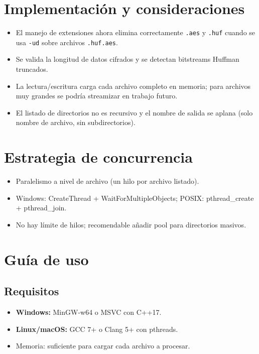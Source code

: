 \documentclass[12pt,a4paper]{article}
\begin{document}
\section{Implementación y consideraciones}
\begin{itemize}
    \item El manejo de extensiones ahora elimina correctamente \texttt{.aes} y \texttt{.huf} cuando se usa \texttt{-ud} sobre archivos \texttt{.huf.aes}.
    \item Se valida la longitud de datos cifrados y se detectan bitstreams Huffman truncados.
    \item La lectura/escritura carga cada archivo completo en memoria; para archivos muy grandes se podría streamizar en trabajo futuro.
    \item El listado de directorios no es recursivo y el nombre de salida se aplana (solo nombre de archivo, sin subdirectorios).
\end{itemize}

\section{Estrategia de concurrencia}
\begin{itemize}
    \item Paralelismo a nivel de archivo (un hilo por archivo listado).
    \item Windows: CreateThread + WaitForMultipleObjects; POSIX: pthread\_create + pthread\_join.
    \item No hay límite de hilos; recomendable añadir pool para directorios masivos.
\end{itemize}

\section{Guía de uso}

\subsection{Requisitos}
\begin{itemize}
    \item \textbf{Windows:} MinGW-w64 o MSVC con C++17.
    \item \textbf{Linux/macOS:} GCC 7+ o Clang 5+ con pthreads.
    \item Memoria: suficiente para cargar cada archivo a procesar.
\end{itemize}
\end{document}
